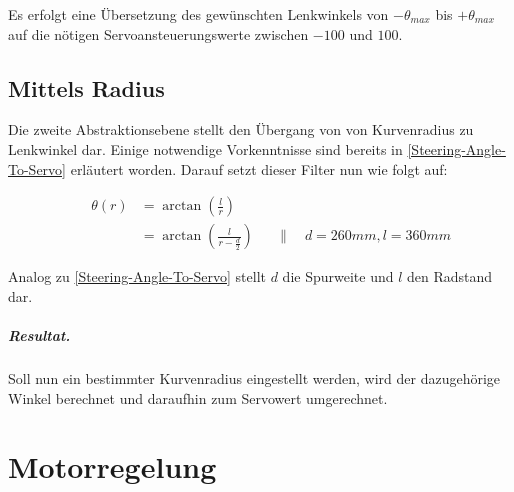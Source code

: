 \documentclass[a4paper,12pt]{report}
\begin{document}
	Es erfolgt eine Übersetzung des gewünschten Lenkwinkels von $-\theta_{max}$ bis $+\theta_{max}$ auf die nötigen Servoansteuerungswerte zwischen $-100$ und $100$.

\section{Mittels Radius}

	Die zweite Abstraktionsebene stellt den Übergang von von Kurvenradius zu Lenkwinkel dar.
	Einige notwendige Vorkenntnisse sind bereits in \autoref{Steering-Angle-To-Servo} erläutert worden.
	Darauf setzt dieser Filter nun wie folgt auf:

		\begin{align*}
		&&\theta\left(r\right) &= \arctan\left( \frac{l}{r} \right)\\
		&&&= \arctan\left( \frac{l}{r - \frac{d}{2}} \right) &&\|\quad d = 260mm, l = 360mm
		\end{align*}

	Analog zu \autoref{Steering-Angle-To-Servo} stellt $d$ die Spurweite und $l$ den Radstand dar.

	\paragraph{Resultat.}
	Soll nun ein bestimmter Kurvenradius eingestellt werden, wird der dazugehörige Winkel berechnet und daraufhin zum Servowert umgerechnet.


\chapter{Motorregelung}
\end{document}
